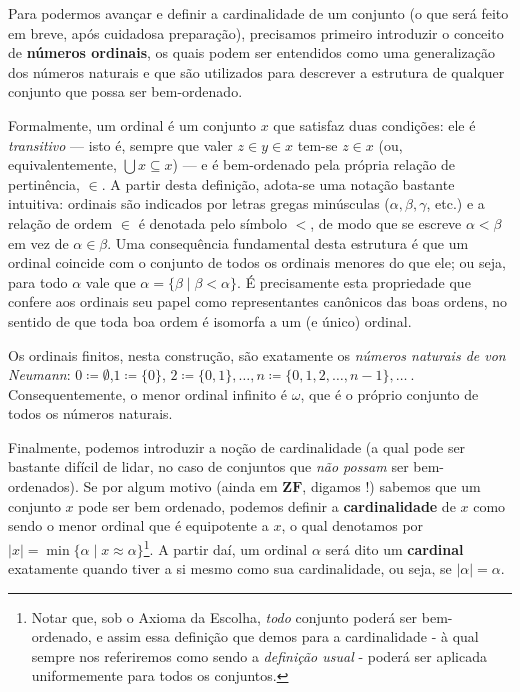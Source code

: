 \documentclass{hipatia}
\newcommand{\zf}{\mathbf{ZF}}
\begin{document}
Para podermos avançar e definir a
 cardinalidade de um conjunto (o que será feito em breve, após cuidadosa preparação), precisamos primeiro introduzir o conceito de \textbf{números ordinais}, os quais podem ser entendidos como uma generalização dos números naturais e que são utilizados para descrever a estrutura de qualquer conjunto que possa ser bem-ordenado.

Formalmente, um ordinal é um conjunto $x$ que satisfaz duas condições: ele é {\it transitivo} --- isto é, sempre que valer $z \in y \in x$ tem-se $z \in x$ (ou, equivalentemente, $\bigcup x \subseteq x$) --- e é bem-ordenado pela própria relação de pertinência, $\in$. A partir desta definição, adota-se uma notação bastante intuitiva: ordinais são indicados por letras gregas minúsculas ($\alpha, \beta, \gamma$, etc.) e a relação de ordem $\in$ é denotada pelo símbolo $<$, de modo que se escreve $\alpha < \beta$ em vez de $\alpha \in \beta$. Uma consequência fundamental desta estrutura é que um ordinal coincide com o conjunto de todos os ordinais menores do que ele; ou seja, para todo $\alpha$ vale que $\alpha = \{\beta \mid \beta < \alpha\}$. É precisamente esta propriedade que confere aos ordinais seu papel como representantes canônicos das boas ordens, no sentido de que toda boa ordem é isomorfa a um (e único) ordinal.

Os ordinais finitos, nesta construção, são exatamente os {\it números naturais de von Neumann}: $0\coloneq\emptyset$,\linebreak $1\coloneq\{0\}$, $2\coloneq\{0,1\}, \ldots, n\coloneq\{0,1,2,\ldots,n-1\}, \ldots~$. Consequentemente, o menor ordinal infinito é $\omega$, que é o próprio conjunto de todos os números naturais.


Finalmente, podemos introduzir a noção de cardinalidade (a qual pode ser bastante difícil de lidar, no caso de conjuntos que {\it não possam} ser bem-ordenados). Se por algum motivo (ainda em $\zf$, digamos !) sabemos que um conjunto $x$ pode ser bem ordenado, podemos definir a \textbf{cardinalidade} de $x$ como sendo o menor ordinal que é equipotente a $x$, o qual denotamos por\linebreak $|x|=\min{\{\alpha\mid x\approx\alpha\}}$\footnote{Notar que, sob o Axioma da Escolha, {\it todo} conjunto poderá ser bem-ordenado, e assim essa definição que demos para a cardinalidade - à qual sempre nos referiremos como sendo a {\it definição usual} - poderá ser aplicada uniformemente para todos os conjuntos.}. A partir daí, um ordinal $\alpha$ será dito um \textbf{cardinal} exatamente quando tiver a si mesmo como sua cardinalidade, ou seja, se $|\alpha|=\alpha$.
\end{document}
